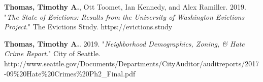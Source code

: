 \begin{cvparagraph}

\textbf{Thomas, Timothy A.}, Ott Toomet, Ian Kennedy, and Alex Ramiller. 2019. "\emph{The State of Evictions: Results from the University of Washington Evictions Project}." The Evictions Study. https://evictions.study
\end{cvparagraph}

\begin{cvparagraph}

\textbf{Thomas, Timothy A.}. 2019. "\emph{Neighborhood Demographics, Zoning, & Hate Crime Report}." City of Seattle. http://www.seattle.gov/Documents/Departments\newline/CityAuditor/auditreports/2017-09\%20Hate\%20Crimes\%20Ph2\_Final.pdf
\end{cvparagraph}